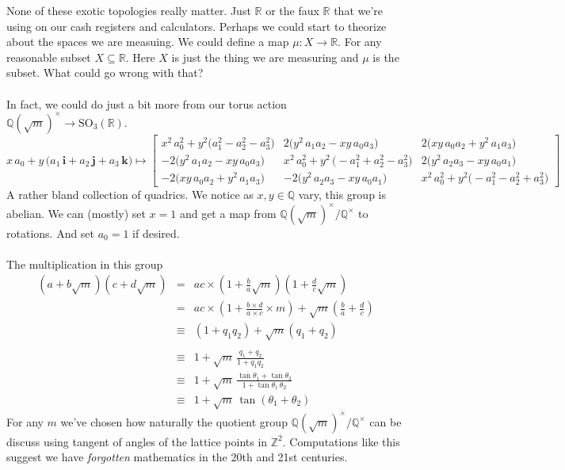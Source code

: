 \documentclass[12pt]{article}
\begin{document}
None of these exotic topologies really matter.  Just $\mathbb{R}$ or the faux $\mathbb{R}$ that we're using on our cash registers and calculators.
  Perhaps we could start to theorize about the spaces we are measuing.  We could define a map $ \mu: X \to \mathbb{R}$.  For any reasonable subset $X \subseteq \mathbb{R}$.  Here $X$ is just the thing we are measuring and $\mu$ is the subset.  What could go wrong with that?  \\ \\
In fact, we could do just a bit more from our torus action $\mathbb{Q}(\sqrt{m})^\times \to \text{SO}_3(\mathbb{R})$. 
$$x \, a_0 + y \,\big( a_1 \, \mathbf{i} + a_2 \, \mathbf{j} + a_3 \, \mathbf{k}\big)
\mapsto \left[ \begin{array}{cccc}
x^2 \, a_0^2 + y^2 \big(a_1^2 - a_2^2 - a_3^2\big) & 2\big(y^2 \, a_1 a_2 - xy \, a_0 a_3\big) & 
2\big(xy\,a_0 a_2 + y^2\,a_1 a_3\big) \\
-2\big( y^2 \, a_1 a_2 - xy \, a_0 a_3\big) & x^2 \, a_0^2  + y^2 \,\big(- a_1^2 + a_2^2 - a_3^2 \big) & 2\big( y^2\, a_2 a_3 -  xy \, a_0 a_1\big) \\
-2\big(xy \, a_0 a_2 + y^2 \, a_1 a_3\big) & -2\big( y^2 \, a_2 a_3 - xy \, a_0 a_1\big) & x^2 \, a_0^2 + y^2 \big(- a_1^2 - a_2^2 + a_3^2 \big) \end{array} \right]  $$
A rather bland collection of quadrics.  We notice as $x, y \in \mathbb{Q}$ vary, this group is abelian.  We can (mostly) set $x = 1$ and get a map from $\mathbb{Q}(\sqrt{m})^\times / \mathbb{Q}^\times$ to rotations.  And set $a_0 = 1$ if desired. \\ \\
The multiplication in this group
\begin{eqnarray*} (a+b\sqrt{m})(c+d\sqrt{m}) &=& ac \times (1 + \frac{b}{a}\sqrt{m})(1+\frac{d}{c}\sqrt{m}) \\
&=& ac \times \left( 1 + \frac{b \times d}{a \times c} \times m \right) + \sqrt{m} \left( \frac{b}{a} + \frac{d}{c} \right) \\
&\equiv&  (1 + q_1q_2) + \sqrt{m}( q_1 + q_2) \\ \\
&\equiv & 1 + \sqrt{m}\, \frac{q_1 + q_2}{1 + q_1q_2}  \\ 
&\equiv & 1 + \sqrt{m}\, \frac{\tan \theta_1 + \tan \theta_2}{1 + \tan \theta_1 \, \theta_2} \\
&\equiv& 1 + \sqrt{m} \, \tan (\theta_1 + \theta_2)\end{eqnarray*}
For any $m$ we've chosen how naturally the quotient group $\mathbb{Q}(\sqrt{m})^\times/\mathbb{Q}^\times$ can be discuss using tangent of angles of the lattice points in $\mathbb{Z}^2$.  Computations like this suggest we have \textit{forgotten} mathematics in the 20th and 21st centuries. \\ \\
\end{document}

